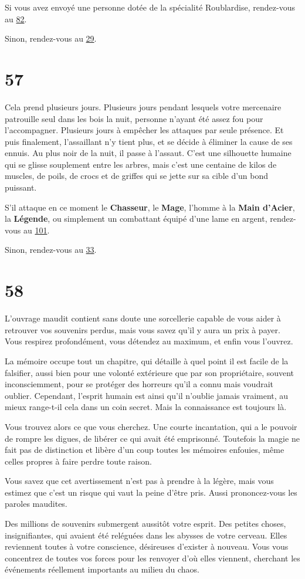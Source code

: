\documentclass{report}
\newcommand{\gsection}[1]{
    \section{#1}
    \label{section-#1}
}
\newcommand{\glink}[1]{\hyperref[section-#1]{#1}}
\newcommand{\hero}[1]{\textbf{#1}}
\begin{document}
Si vous avez envoyé une personne dotée de la spécialité Roublardise, rendez-vous au \glink{82}.

Sinon, rendez-vous au \glink{29}.

\gsection{57}

Cela prend plusieurs jours. Plusieurs jours pendant lesquels votre mercenaire patrouille seul dans les bois la nuit, personne n'ayant été assez fou pour l'accompagner. Plusieurs jours à empêcher les attaques par seule présence. Et puis finalement, l'assaillant n'y tient plus, et se décide à éliminer la cause de ses ennuis. Au plus noir de la nuit, il passe à l'assaut. C'est une silhouette humaine qui se glisse souplement entre les arbres, mais c'est une centaine de kilos de muscles, de poils, de crocs et de griffes qui se jette sur sa cible d'un bond puissant. 

S'il attaque en ce moment le \hero{Chasseur}, le \hero{Mage}, l'homme à la \hero{Main d'Acier}, la \hero{Légende}, ou simplement un combattant équipé d'une lame en argent, rendez-vous au \glink{101}.

Sinon, rendez-vous au \glink{33}.

\gsection{58}

L'ouvrage maudit contient sans doute une sorcellerie capable de vous aider à retrouver vos souvenirs perdus, mais vous savez qu'il y aura un prix à payer. Vous respirez profondément, vous détendez au maximum, et enfin vous l'ouvrez.

La mémoire occupe tout un chapitre, qui détaille à quel point il est facile de la falsifier, aussi bien pour une volonté extérieure que par son propriétaire, souvent inconsciemment, pour se protéger des horreurs qu'il a connu mais voudrait oublier. Cependant, l'esprit humain est ainsi qu'il n'oublie jamais vraiment, au mieux range-t-il cela dans un coin secret. Mais la connaissance est toujours là.

Vous trouvez alors ce que vous cherchez. Une courte incantation, qui a le pouvoir de rompre les digues, de libérer ce qui avait été emprisonné. Toutefois la magie ne fait pas de distinction et libère d'un coup toutes les mémoires enfouies, même celles propres à faire perdre toute raison.

Vous savez que cet avertissement n'est pas à prendre à la légère, mais vous estimez que c'est un risque qui vaut la peine d'être pris. Aussi prononcez-vous les paroles maudites.

Des millions de souvenirs submergent aussitôt votre esprit. Des petites choses, insignifiantes, qui avaient été reléguées dans les abysses de votre cerveau. Elles reviennent toutes à votre conscience, désireuses d'exister à nouveau. Vous vous concentrez de toutes vos forces pour les renvoyer d'où elles viennent, cherchant les événements réellement importants au milieu du chaos.
\end{document}
